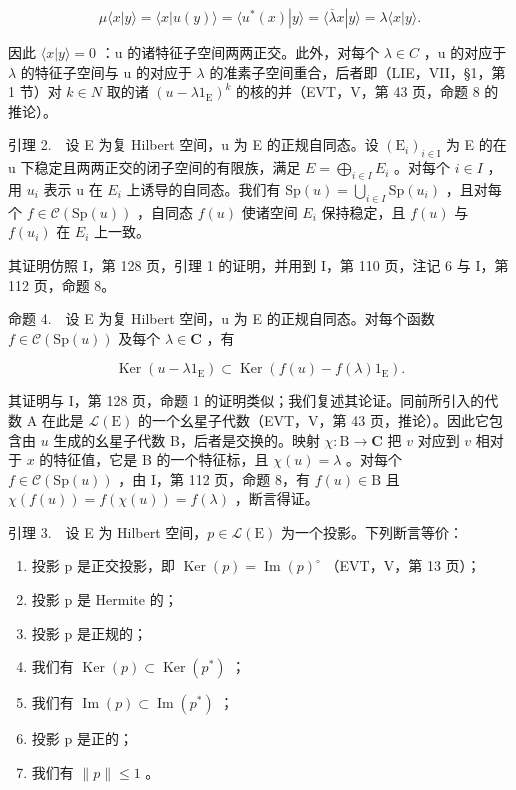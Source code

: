 \[
\mu \langle x | y \rangle = \langle x | u (y) \rangle = \langle u ^ {*} (x) | y \rangle = \langle \overline {{\lambda}} x | y \rangle = \lambda \langle x | y \rangle .
\]

因此 \(\langle x|y\rangle = 0\) ：u 的诸特征子空间两两正交。此外，对每个 \(\lambda \in C\) ，u 的对应于 \(\lambda\) 的特征子空间与 u 的对应于 \(\lambda\) 的准素子空间重合，后者即（LIE，VII，§1，第 1 节）对 \(k \in N\) 取的诸 \((u - \lambda1_{\mathrm{E}})^{k}\) 的核的并（EVT，V，第 43 页，命题 8 的推论）。

引理 2.　设 E 为复 Hilbert 空间，u 为 E 的正规自同态。设 \((\mathrm{E}_{i})_{i\in\mathrm{I}}\) 为 E 的在 u 下稳定且两两正交的闭子空间的有限族，满足 \(E=\bigoplus_{i\in I}E_{i}\) 。对每个 \(i\in I\) ，用 \(u_{i}\) 表示 u 在 \(E_{i}\) 上诱导的自同态。我们有 \(\mathrm{Sp}(u)=\bigcup_{i\in I}\mathrm{Sp}(u_{i})\) ，且对每个 \(f\in\mathcal{C}(\mathrm{Sp}(u))\) ，自同态 \(f(u)\) 使诸空间 \(E_{i}\) 保持稳定，且 \(f(u)\) 与 \(f(u_{i})\) 在 \(E_{i}\) 上一致。

其证明仿照 I，第 128 页，引理 1 的证明，并用到 I，第 110 页，注记 6 与 I，第 112 页，命题 8。

命题 4.　设 E 为复 Hilbert 空间，u 为 E 的正规自同态。对每个函数 \(f \in \mathcal{C}(\mathrm{Sp}(u))\) 及每个 \(\lambda \in \mathbf{C}\) ，有

\[
\operatorname{Ker} (u - \lambda 1 _ {\mathrm{E}}) \subset \operatorname{Ker} (f (u) - f (\lambda) 1 _ {\mathrm{E}}).
\]

其证明与 I，第 128 页，命题 1 的证明类似；我们复述其论证。同前所引入的代数 A 在此是 \(\mathcal{L}(\mathrm{E})\) 的一个幺星子代数（EVT，V，第 43 页，推论）。因此它包含由 \(u\) 生成的幺星子代数 B，后者是交换的。映射 \(\chi: \mathrm{B} \to \mathbf{C}\) 把 \(v\) 对应到 \(v\) 相对于 \(x\) 的特征值，它是 B 的一个特征标，且 \(\chi(u) = \lambda\) 。对每个 \(f \in \mathcal{C}(\mathrm{Sp}(u))\) ，由 I，第 112 页，命题 8，有 \(f(u) \in \mathrm{B}\) 且 \(\chi(f(u)) = f(\chi(u)) = f(\lambda)\) ，断言得证。

引理 3.　设 E 为 Hilbert 空间，\(p \in \mathcal{L}(\mathrm{E})\) 为一个投影。下列断言等价：

\begin{enumerate}
\def\labelenumi{(\roman{enumi})}
\item
  投影 p 是正交投影，即 \(\operatorname{Ker}(p)=\operatorname{Im}(p)^{\circ}\) （EVT，V，第 13 页）；
\item
  投影 p 是 Hermite 的；
\item
  投影 p 是正规的；
\item
  我们有 \(\operatorname{Ker}(p) \subset \operatorname{Ker}(p^*)\) ；
\item
  我们有 \(\operatorname{Im}(p) \subset \operatorname{Im}(p^*)\) ；
\item
  投影 p 是正的；
\item
  我们有 \(\| p\| \leqslant 1\) 。
\end{enumerate}

